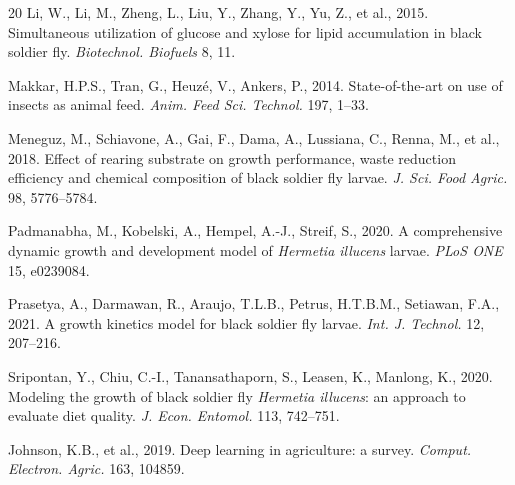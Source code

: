 \documentclass[12pt,a4paper]{article}
\begin{document}
\begin{thebibliography}{20}
Li, W., Li, M., Zheng, L., Liu, Y., Zhang, Y., Yu, Z., et al., 2015. Simultaneous utilization of glucose and xylose for lipid accumulation in black soldier fly. \textit{Biotechnol. Biofuels} 8, 11.

Makkar, H.P.S., Tran, G., Heuz\'{e}, V., Ankers, P., 2014. State-of-the-art on use of insects as animal feed. \textit{Anim. Feed Sci. Technol.} 197, 1--33.

Meneguz, M., Schiavone, A., Gai, F., Dama, A., Lussiana, C., Renna, M., et al., 2018. Effect of rearing substrate on growth performance, waste reduction efficiency and chemical composition of black soldier fly larvae. \textit{J. Sci. Food Agric.} 98, 5776--5784.

Padmanabha, M., Kobelski, A., Hempel, A.-J., Streif, S., 2020. A comprehensive dynamic growth and development model of \textit{Hermetia illucens} larvae. \textit{PLoS ONE} 15, e0239084.

Prasetya, A., Darmawan, R., Araujo, T.L.B., Petrus, H.T.B.M., Setiawan, F.A., 2021. A growth kinetics model for black soldier fly larvae. \textit{Int. J. Technol.} 12, 207--216.

Sripontan, Y., Chiu, C.-I., Tanansathaporn, S., Leasen, K., Manlong, K., 2020. Modeling the growth of black soldier fly \textit{Hermetia illucens}: an approach to evaluate diet quality. \textit{J. Econ. Entomol.} 113, 742--751.

Johnson, K.B., et al., 2019. Deep learning in agriculture: a survey. \textit{Comput. Electron. Agric.} 163, 104859.

\end{thebibliography}
\end{document}
